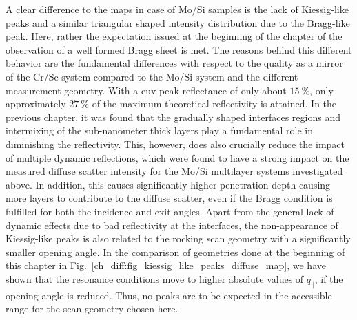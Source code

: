 A clear difference to the maps in case of Mo/Si samples is the lack of Kiessig-like peaks and a similar triangular shaped intensity distribution due to the Bragg-like peak. Here, rather the expectation issued at the beginning of the chapter of the observation of a well formed Bragg sheet is met. The reasons behind this different behavior are the fundamental differences with respect to the quality as a mirror of the Cr/Sc system compared to the Mo/Si system and the different measurement geometry. With a \gls{euv} peak reflectance of only about $\SI{15}{\percent}$, only approximately $\SI{27}{\percent}$ of the maximum theoretical reflectivity is attained. In the previous chapter, it was found that the gradually shaped interfaces regions and intermixing of the sub-nanometer thick layers play a fundamental role in diminishing the reflectivity. This, however, does also crucially reduce the impact of multiple dynamic reflections, which were found to have a strong impact on the measured diffuse scatter intensity for the Mo/Si multilayer systems investigated above. In addition, this causes significantly higher penetration depth causing more layers to contribute to the diffuse scatter, even if the Bragg condition is fulfilled for both the incidence and exit angles. Apart from the general lack of dynamic effects due to bad reflectivity at the interfaces, the non-appearance of Kiessig-like peaks is also related to the rocking scan geometry with a significantly smaller opening angle. In the comparison of geometries done at the beginning of this chapter in Fig.~\ref{ch_diff:fig_kiessig_like_peaks_diffuse_map}, we have shown that the resonance conditions move to higher absolute values of $q_\parallel$, if the opening angle is reduced. Thus, no peaks are to be expected in the accessible range for the scan geometry chosen here.

